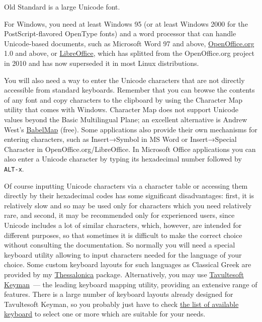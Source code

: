 \documentclass[12pt,a4paper,openany]{book}
\begin{document}
Old Standard is a large Unicode font.

For Windows, you need at least Windows 95 (or at least Windows 2000 for the
PostScript-flavored OpenType fonts) and a word processor that can handle
Unicode-based documents, such as Microsoft Word 97 and above,
\href{http://www.openoffice.org}{OpenOffice.org} 1.0 and above,
or \href{http://www.libreoffice.org}{LibreOffice}, which has
splitted from the OpenOffice.org project in 2010 and has now superseded
it in most Linux distributions.

You will also need a way to enter the Unicode characters that are not
directly accessible from standard keyboards. Remember that you can browse
the contents of any font and copy characters to the clipboard by using the
Character Map utility that comes with Windows. Character Map does not
support Unicode values beyond the Basic Multilingual Plane; an excellent
alternative is Andrew West’s
\href{http://www.babelstone.co.uk/Software/BabelMap.html}{BabelMap}
(free). Some applications also provide their own mechanisms for entering
characters, such as Insert→Symbol in MS Word or Insert→Special Character
in OpenOffice.org/LibreOffice. In Microsoft Office applications you can also enter 
a Unicode character by typing its hexadecimal number followed by
\texttt{ALT-x}.

Of course inputting Unicode characters via a character table or accessing
them directly by their hexadecimal codes has some significant
disadvantages: first, it is relatively slow and so may be used only for
characters which you need relatively rare, and second, it may be
recommended only for experienced users, since Unicode includes a lot of
similar characters, which, however, are intended for different purposes, so
that sometimes it is difficult to make the correct choice without
consulting the documentation. So normally you will need a special keyboard
utility allowing to input characters needed for the language of your
choice. Some custom keyboard layouts for such languages as Classical Greek
are provided by my \href{http://www.thessalonica.org.ru}{Thessalonica}
package. Alternatively, you may use
\href{http://www.tavultesoft.com/keyman/}{Tavultesoft Keyman}~— the
leading keyboard mapping utility, providing an extensive range of features.
There is a large number of keyboard layouts already designed for
Tavultesoft Keyman, so you probably just have to check
\href{http://www.tavultesoft.com/keyman/downloads/keyboards/}{the list of
available keyboard} to select one or more which are suitable for your
needs.
\end{document}
